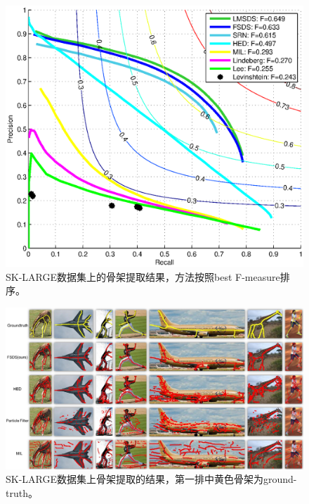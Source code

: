 \documentclass[UTF8]{ctexart}
\numberwithin{equation}{section} %
\numberwithin{table}{section} %
\begin{document}
\begin{figure}[H]
\centering
\includegraphics[scale=0.5]{figures/pr-skl.eps}
\caption{SK-LARGE数据集上的骨架提取结果，方法按照best F-measure排序。}
\label{fig:pr_skl}
\end{figure}
\begin{figure}[!htb]
\centering
\includegraphics[scale=0.25]{figures/examples_skl.png}
\caption{SK-LARGE数据集上骨架提取的结果，第一排中黄色骨架为ground-truth。}
\label{fig:examples_skl}
\end{figure}
\end{document}
